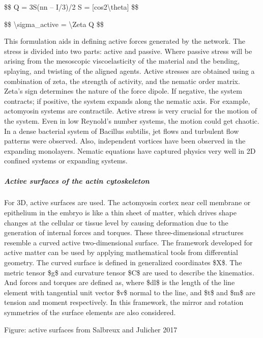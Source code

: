 \documentclass[
]{article}
\begin{document}
\$\$ Q = 3S(nn -- I/3)/2 S = {[}cos2\textbackslash theta{]} \$\$

\$\$ \textbackslash sigma\_active = \textbackslash Zeta Q \$\$

This formulation aids in defining active forces generated by the
network. The stress is divided into two parts: active and passive. Where
passive stress will be arising from the mesoscopic viscoelasticity of
the material and the bending, splaying, and twisting of the aligned
agents. Active stresses are obtained using a combination of zeta, the
strength of activity, and the nematic order matrix. Zeta's sign
determines the nature of the force dipole. If negative, the system
contracts; if positive, the system expands along the nematic axis. For
example, actomyosin systems are contractile. Active stress is very
crucial for the motion of the system. Even in low Reynold's number
systems, the motion could get chaotic. In a dense bacterial system of
Bacillus subtilis, jet flows and turbulent flow patterns were observed.
Also, independent vortices have been observed in the expanding
monolayers. Nematic equations have captured physics very well in 2D
confined systems or expanding systems.

\hypertarget{active-surfaces-of-the-actin-cytoskeleton}{%
\subparagraph{Active surfaces of the actin
cytoskeleton}\label{active-surfaces-of-the-actin-cytoskeleton}}

For 3D, active surfaces are used. The actomyosin cortex near cell
membrane or epithelium in the embryo is like a thin sheet of matter,
which drives shape changes at the cellular or tissue level by causing
deformation due to the generation of internal forces and torques. These
three-dimensional structures resemble a curved active two-dimensional
surface. The framework developed for active matter can be used by
applying mathematical tools from differential geometry. The curved
surface is defined in generalized coordinates \$X\$. The metric tensor
\$g\$ and curvature tensor \$C\$ are used to describe the kinematics.
And forces and torques are defined as, where \$dl\$ is the length of the
line element with tangential unit vector \$v\$ normal to the line, and
\$t\$ and \$m\$ are tension and moment respectively. In this framework,
the mirror and rotation symmetries of the surface elements are also
considered.

Figure: active surfaces from Salbreux and Julicher 2017
\end{document}
